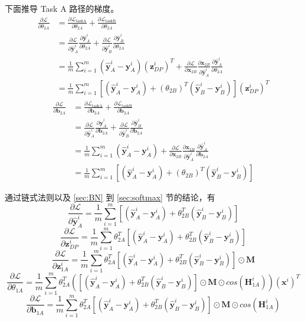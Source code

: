 \documentclass[lang=cn,11pt,a4paper,cite=authoryear]{elegantpaper}
\newcommand{\diff}[2]{\frac{\partial #1}{\partial #2}}
\newcommand{\hbf}[1]{\hat{\mathbf{#1}}}
\begin{document}
下面推导 Task A 路径的梯度。
\begin{equation}
  \begin{aligned}
    \diff{\mathcal{L}}{\theta_{2A}}&=\diff{\mathcal{L}_{\text{taskA}}}{\theta_{2A}}+\diff{\mathcal{L}_{\text{taskB}}}{\theta_{2A}} \\
    &=\diff{\mathcal{L}}{\hbf{y}_A^i}\diff{\hbf{y}_A^i}{\theta_{2A}}+\diff{\mathcal{L}}{\hbf{y}_B^i}\diff{\hbf{y}_B^i}{\theta_{2A}} \\
    &=\frac{1}{m}\sum_{i=1}^m(\hbf{y}_A^i-\mathbf{y}_A^i)(\mathbf{z}_{DP}^i)^T+\diff{\mathcal{L}}{\mathbf{x}_{2B}}\diff{\mathbf{x}_{2B}}{\hbf{y}_A^i}\diff{\hbf{y}_A^i}{\theta_{2A}}\\
    &=\frac{1}{m}\sum_{i=1}^m[(\hbf{y}_A^i-\mathbf{y}_A^i)+(\theta_{2B})^T(\hbf{y}_B^i-\mathbf{y}_B^i)](\mathbf{z}_{DP}^i)^T
  \end{aligned}
\end{equation}
\begin{equation}
  \begin{aligned}
    \diff{\mathcal{L}}{\mathbf{b}_{2A}}&=\diff{\mathcal{L}_{\text{taskA}}}{\mathbf{b}_{2A}}+\diff{\mathcal{L}_{\text{taskB}}}{\mathbf{b}_{2A}} \\
    &=\diff{\mathcal{L}}{\hbf{y}_A^i}\diff{\hbf{y}_A^i}{\mathbf{b}_{2A}}+\diff{\mathcal{L}}{\hbf{y}_B^i}\diff{\hbf{y}_B^i}{\mathbf{b}_{2A}} \\
    &=\frac{1}{m}\sum_{i=1}^m(\hbf{y}_A^i-\mathbf{y}_A^i)+\diff{\mathcal{L}}{\mathbf{x}_{2B}}\diff{\mathbf{x}_{2B}}{\hbf{y}_A^i}\diff{\hbf{y}_A^i}{\mathbf{b}_{2A}}\\
    &=\frac{1}{m}\sum_{i=1}^m[(\hbf{y}_A^i-\mathbf{y}_A^i)+(\theta_{2B})^T(\hbf{y}_B^i-\mathbf{y}_B^i)]
  \end{aligned}
\end{equation}

通过链式法则以及 \ref{sec:BN} 到 \ref{sec:softmax} 节的结论，有
\begin{equation}
  \diff{\mathcal{L}}{\hbf{y}_A^i}=\frac{1}{m}\sum_{i=1}^m[(\hbf{y}_A^i-\mathbf{y}_A^i)+\theta_{2B}^T(\hbf{y}_B^i-\mathbf{y}_B^i)]
\end{equation}
\begin{equation}
  \diff{\mathcal{L}}{\mathbf{z}_{DP}^i}=\frac{1}{m}\sum_{i=1}^m\theta_{2A}^T[(\hbf{y}_A^i-\mathbf{y}_A^i)+\theta_{2B}^T(\hbf{y}_B^i-\mathbf{y}_B^i)]
\end{equation}
\begin{equation}
  \diff{\mathcal{L}}{\mathbf{z}_{1A}^i}=\frac{1}{m}\sum_{i=1}^m\theta_{2A}^T[(\hbf{y}_A^i-\mathbf{y}_A^i)+\theta_{2B}^T(\hbf{y}_B^i-\mathbf{y}_B^i)]\odot \mathbf{M} 
\end{equation}
\begin{equation}
  \diff{\mathcal{L}}{\theta_{1A}}=\frac{1}{m}\sum_{i=1}^m\theta_{2A}^T\left([(\hbf{y}_A^i-\mathbf{y}_A^i)+\theta_{2B}^T(\hbf{y}_B^i-\mathbf{y}_B^i)]\odot \mathbf{M}\odot cos(\mathbf{H}_{1A}^i)\right )(\mathbf{x}^i)^T
\end{equation}
\begin{equation}
  \diff{\mathcal{L}}{\mathbf{b}_{1A}}=\frac{1}{m}\sum_{i=1}^m\theta_{2A}^T[(\hbf{y}_A^i-\mathbf{y}_A^i)+\theta_{2B}^T(\hbf{y}_B^i-\mathbf{y}_B^i)]\odot \mathbf{M}\odot cos(\mathbf{H}_{1A}^i)
\end{equation}
\end{document}
